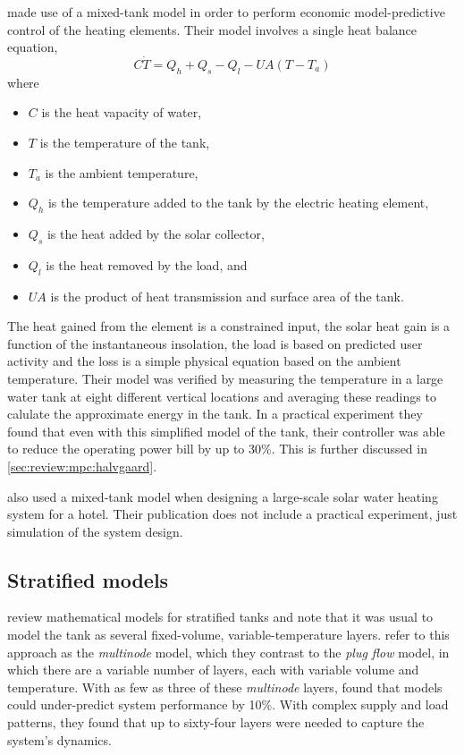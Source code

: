 \textcite{Halvgaard12} made use of a mixed-tank model in order to perform economic model-predictive control of the heating elements.
Their model involves a single heat balance equation,
$$ C \dot{T} = Q_h + Q_s - Q_l - U A (T - T_a) $$
where
\begin{itemize}
   \item $C$ is the heat vapacity of water,
   \item $T$ is the temperature of the tank,
   \item $T_a$ is the ambient temperature,
   \item $Q_h$ is the temperature added to the tank by the electric heating element,
   \item $Q_s$ is the heat added by the solar collector,
   \item $Q_l$ is the heat removed by the load, and
   \item $U A$ is the product of heat transmission and surface area of the tank.
\end{itemize}
The heat gained from the element is a constrained input, the solar heat gain is a function of the instantaneous insolation, the load is based on predicted user activity and the loss is a simple physical equation based on the ambient temperature.
Their model was verified by measuring the temperature in a large water tank at eight different vertical locations and averaging these readings to calulate the approximate energy in the tank.
In a practical experiment they found that even with this simplified model of the tank, their controller was able to reduce the operating power bill by up to 30\%.
This is further discussed in \autoref{sec:review:mpc:halvgaard}.

\textcite{Cao14} also used a mixed-tank model when designing a large-scale solar water heating system for a hotel.
Their publication does not include a practical experiment, just simulation of the system design.

\subsection{Stratified models}
\label{sec:review:stratified-tank-models}

\textcite{Hollands89} review mathematical models for stratified tanks and note that it was usual to model the tank as several fixed-volume, variable-temperature layers.
\textcite{Kleinbach93} refer to this approach as the \emph{multinode} model, which they contrast to the \emph{plug flow} model, in which there are a variable number of layers, each with variable volume and temperature.
With as few as three of these \emph{multinode} layers,  found that models could under-predict system performance by 10\%.
With complex supply and load patterns, they found that up to sixty-four layers were needed to capture the system's dynamics.

